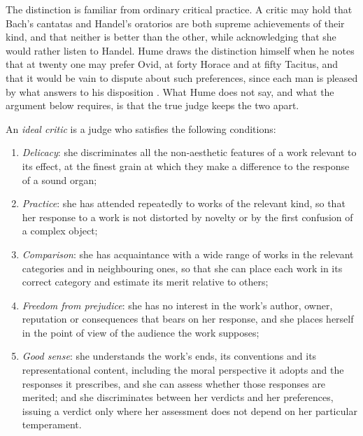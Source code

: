 \documentclass{situationist-preprint}
\begin{document}
The distinction is familiar from ordinary critical practice. A critic may hold that Bach's cantatas and Handel's oratorios are both supreme achievements of their kind, and that neither is better than the other, while acknowledging that she would rather listen to Handel. Hume draws the distinction himself when he notes that at twenty one may prefer Ovid, at forty Horace and at fifty Tacitus, and that it would be vain to dispute about such preferences, since each man is pleased by what answers to his disposition \citep{Hume1757}. What Hume does not say, and what the argument below requires, is that the true judge keeps the two apart.

\begin{definition}\label{d:ideal}
An \emph{ideal critic} is a judge who satisfies the following conditions:
\begin{enumerate}[label=(\roman*),nosep]
\item \emph{Delicacy}: she discriminates all the non-aesthetic features of a work relevant to its effect, at the finest grain at which they make a difference to the response of a sound organ;
\item \emph{Practice}: she has attended repeatedly to works of the relevant kind, so that her response to a work is not distorted by novelty or by the first confusion of a complex object;
\item \emph{Comparison}: she has acquaintance with a wide range of works in the relevant categories and in neighbouring ones, so that she can place each work in its correct category and estimate its merit relative to others;
\item \emph{Freedom from prejudice}: she has no interest in the work's author, owner, reputation or consequences that bears on her response, and she places herself in the point of view of the audience the work supposes;
\item \emph{Good sense}: she understands the work's ends, its conventions and its representational content, including the moral perspective it adopts and the responses it prescribes, and she can assess whether those responses are merited; and she discriminates between her verdicts and her preferences, issuing a verdict only where her assessment does not depend on her particular temperament.
\end{enumerate}
\end{definition}
\end{document}
